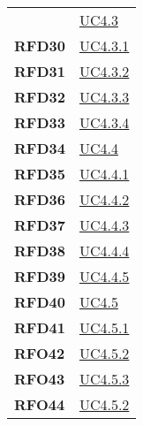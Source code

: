 \begin{longtable}[H]{>{\centering\bfseries}m{8cm} >{\centering\arraybackslash}m{8cm}}
    &  \hyperref[ssub:uc4.3]{UC4.3} \\

    RFD30
    &  \hyperref[ssub:uc4.3.1]{UC4.3.1} \\

    RFD31
    &  \hyperref[ssub:uc4.3.2]{UC4.3.2} \\

    RFD32

    &  \hyperref[ssub:uc4.3.3]{UC4.3.3} \\

    RFD33

    &  \hyperref[ssub:uc4.3.2]{UC4.3.4} \\

    RFD34

    &  \hyperref[ssub:uc4.4]{UC4.4} \\

    RFD35

    &  \hyperref[ssub:uc4.4.1]{UC4.4.1} \\

    RFD36

    &  \hyperref[ssub:uc4.4.2]{UC4.4.2} \\

    RFD37

    &  \hyperref[ssub:uc4.4.3]{UC4.4.3} \\

    RFD38

    &  \hyperref[ssub:uc4.4.4]{UC4.4.4} \\

    RFD39

    &  \hyperref[ssub:uc4.4.5]{UC4.4.5} \\

    RFD40
    
    &  \hyperref[ssub:uc4.5]{UC4.5} \\

    RFD41
  
    &  \hyperref[ssub:uc4.5.1]{UC4.5.1} \\

    RFO42
  
    &  \hyperref[ssub:uc4.5.2]{UC4.5.2} \\

    RFO43
  
    &  \hyperref[ssub:uc4.5.3]{UC4.5.3} \\

    RFO44
    
    &  \hyperref[ssub:uc4.5.2]{UC4.5.2} \\


\end{longtable}
